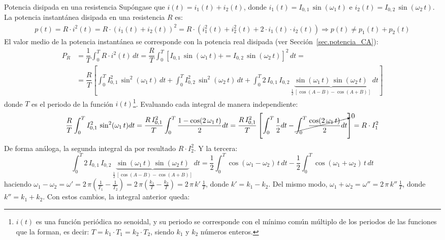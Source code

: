 \documentclass[11pt]{book} %
\makeatletter
\numberwithin{dummy}{section}
\theoremstyle{ocrenumbox}
\theoremstyle{blacknumex}
\theoremstyle{blacknumbox}
\theoremstyle{ocrenum}
\renewcommand{\subsubsection}{\@startsection {subsubsection}{3}{\z@}
{-2ex \@plus -0.1ex \@minus -.2ex}
{.2ex \@plus.2ex }
{\normalfont\small\sffamily\bfseries}}
\newlength\esp
\makeatother
\begin{document}
\subsubsection{Potencia disipada en una resistencia}
Supóngase que $i(t) = i_1(t) + i_2(t)$, donde $i_1(t)=I_{0,1}\,\sin(\omega_1\,t)$ e $i_2(t)=I_{0,2}\,\sin(\omega_2\,t)$. La potencia instantánea disipada en una resistencia $R$ es:
\begin{align*}
  p(t) = R \cdot i^2(t) = R \cdot (i_1(t) + i_2(t))^2 =R \cdot (i_1^2(t) + i_2^2(t) + 2\cdot i_1(t) \cdot i_2(t))\Rightarrow p(t) \neq p_1(t) + p_2(t)
\end{align*} 
El valor medio de la potencia instantánea se corresponde con la potencia real disipada (ver Sección~\ref{sec.potencia_CA}):
\begin{align*}
    P_R&=\dfrac{1}{T}\int_0^{T}R\cdot i^2(t)\,dt=\dfrac{R}{T}\int_0^T\left[ I_{0,1}\,\sin(\omega_1\,t)+=I_{0,2}\,\sin(\omega_2\,t)\right]^2\,dt=\\
    & = \dfrac{R}{T}\left[ \int_0^T I_{0,1}^2\,\sin^2(\omega_1\,t)\,dt + \int_0^T I_{0,2}^2\,\sin^2(\omega_2\,t)\,dt + 
    \int_0^T 2\,I_{0,1}\, I_{0,2}\,\underbrace{\sin(\omega_1\,t)\,\sin(\omega_2\,t)}_{\frac{1}{2}\,\left[\cos(A-B)-\cos(A+B)\right]}\,dt \right]
\end{align*}
donde $T$ es el periodo de la función $i(t)$\footnote{$i(t)$ es una función periódica no senoidal, y su periodo se corresponde con el mínimo común múltiplo de los periodos de las funciones que la forman, es decir: $T=k_1\cdot T_1=k_2\cdot T_2$, siendo $k_1$ y $k_2$ números enteros.}. Evaluando cada integral de manera independiente:
\begin{equation*}
    \dfrac{R}{T} \int_0^T I_{0,1}^2\,\sin^2(\omega_1\,t)dt=\dfrac{R\,I_{0,1}^2}{T}\int_0^T\dfrac{1-\cos(2\,\omega_1\,t)}{2}dt=\dfrac{R\,I_{0,1}^2}{T}\left[\int_0^T\dfrac{1}{2}dt-\cancelto{0}{\int_0^T \dfrac{\cos(2\,\omega_1\,t)}{2}dt}\right]=R\cdot I_1^2
\end{equation*}
De forma análoga, la segunda integral da por resultado $R\cdot I_2^2$. Y la tercera:
\begin{equation*}
    \int_0^T 2\,I_{0,1}\, I_{0,2}\,\underbrace{\sin(\omega_1\,t)\,\sin(\omega_2\,t)}_{\frac{1}{2}\,\left[\cos(A-B)-\cos(A+B)\right]}\,dt=\dfrac{1}{2}\int_0^T\cos(\omega_1-\omega_2)\,t\,dt-\dfrac{1}{2}\int_0^T\cos(\omega_1+\omega_2)\,t\,dt
\end{equation*}
haciendo $\omega_1-\omega_2=\omega'=2\,\pi\left(\frac{1}{T_1}-\frac{1}{T_2} \right)=2\,\pi\left(\frac{k_1}{T}-\frac{k_2}{T}\right)=2\,\pi\,k'\,\frac{1}{T}$, donde $k'=k_1-k_2$. Del mismo modo, $\omega_1+\omega_2=\omega''=2\,\pi\,k''\,\frac{1}{T}$, donde $k''=k_1+k_2$. Con estos cambios, la integral anterior queda:
\end{document}
